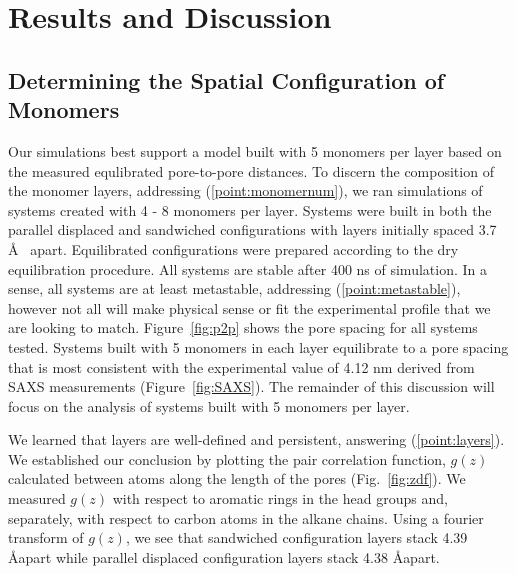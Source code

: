\documentclass{article}
\newcommand{\angstrom}{\textup{\AA}}
\begin{document}
  \section{Results and Discussion}
  
  \subsection{Determining the Spatial Configuration of Monomers}

  Our simulations best support a model built with 5 monomers per layer based on
  the measured equlibrated pore-to-pore distances. To discern the composition of
  the monomer layers, addressing (\ref{point:monomernum}), we ran simulations of
  systems created with 4 - 8 monomers per layer. Systems were built in both the
  parallel displaced and sandwiched configurations with layers initially spaced
  3.7 \AA~ apart. Equilibrated configurations were prepared according to the dry
  equilibration procedure. All systems are stable after 400 ns of simulation. In
  a sense, all systems are at least metastable, addressing
  (\ref{point:metastable}), however not all will make physical sense or fit the
  experimental profile that we are looking to match. Figure~\ref{fig:p2p} shows
  the pore spacing for all systems tested. Systems built with 5 monomers in each
  layer equilibrate to a pore spacing that is most consistent with the
  experimental value of 4.12 nm derived from SAXS measurements
  (Figure~\ref{fig:SAXS}). The remainder of this discussion will focus on the
  analysis of systems built with 5 monomers per layer.

  We learned that layers are well-defined and persistent, answering
  (\ref{point:layers}). We established our conclusion by plotting the pair
  correlation function, $g(z)$ calculated between atoms along the length of the
  pores (Fig.~\ref{fig:zdf}). We measured $g(z)$ with respect to aromatic rings in
  the head groups and, separately, with respect to carbon atoms in the alkane
  chains. Using a fourier transform of $g(z)$, we see that sandwiched
  configuration layers stack 4.39 \angstrom apart while parallel displaced
  configuration layers stack 4.38 \angstrom apart.
\end{document}
